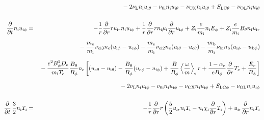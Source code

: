 \documentclass[11pt]{article}
\def\r#1{{\rm#1}}
\def\ddt{\frac{\partial}{\partial t}}
\def\ddr{\frac{\partial}{\partial r}}
\def\ave#1{\left\langle#1\right\rangle}
\def\me{m_\r{e}}
\def\mi{m_\r{i}}
\def\mb{m_\r{b}}
\def\mue{\mu_\r{e}}
\def\mui{\mu_\r{i}}
\def\De{D_\r{e}}
\def\Di{D_\r{i}}
\def\chii{\chi_\r{i}}
\def\nee{n_\r{e}}
\def\ni{n_\r{i}}
\def\nb{n_\r{b}}
\def\uir{u_{\r{i}r}}
\def\ueth{u_{\r{e}\theta}}
\def\uith{u_{\r{i}\theta}}
\def\ueph{u_{\r{e}\phi}}
\def\uiph{u_{\r{i}\phi}}
\def\ubph{u_{\r{b}\phi}}
\def\Er{E_r}
\def\Eph{E_\phi}
\def\Bth{B_\theta}
\def\Bph{B_\phi}
\def\Te{T_\r{e}}
\def\Ti{T_\r{i}}
\def\Zi{Z_\r{i}}
\def\nubi{\nu_\r{bi}}
\def\nuni{\nu_\r{0i}}
\def\nuL{\nu_\r{L}}
\def\nuCX{\nu_\r{CX}}
\def\nuOL{\nu_\r{OL}}
\newcommand{\Frac}[2]{%
  {\displaystyle {\displaystyle #1\over \displaystyle #2}}%
}
\newcommand{\rdprd}[2]{\Frac{\partial #1}{\partial #2}}
\newcommand{\aveaveB}[1]{\left< \!\! \left< #1 \right> \!\! \right>}
\begin{document}
\begin{eqnarray}
\nonumber\\[2.5mm]&&{}
%
  - 2 \nuL \ni \uith
%
  - \nuni \ni \uith
%
  - \nuCX \ni \uith
%
  + S_\r{LC\theta}
%
  - \nuOL \ni \uith
%
%
\\[5mm]
  \ddt \ni \uiph &=&
%
  - \frac{1}{r} \ddr r \uir \ni \uiph
%
  + \frac{1}{r} \ddr r \ni \mui \ddr \uiph
%
  + \Zi \frac{e}{\mi} \ni \Eph
%
  + \Zi \frac{e}{\mi} \Bth \ni \uir 
\nonumber\\[2.5mm]&&{}
%
  - \frac{\me}{\mi} \nu_\r{ei3} \nee (\uiph - \ueph)
%
  - \frac{\me}{\mi} \nu_\r{ei2} \nee (\uith - \ueth)
%
  - \frac{\mb}{\mi} \nubi \nb (\uiph - \ubph)
\nonumber\\[2.5mm]&&{}
%
  - \frac{e^2 \Bph^2 \De}{\mi\Te}\frac{\Bth}{\Bph}\nee
    \left[(\ueth - \uith) - \frac{\Bth}{\Bph}(\ueph - \uiph)
     + \frac{B}{\Bph}\ave{\frac{\omega}{m}}_\r{e} r
     + \frac{1-\alpha_\r{e}}{e\Bph}\ddr \Te + \frac{\Er}{\Bph}\right]
%
\nonumber\\[2.5mm]&&{}
%
  - 2 \nuL \ni \uiph
%
  - \nuni \ni \uiph
%
  - \nuCX \ni \uiph
%
  + S_\r{LC\phi}
%
  - \nuOL \ni \uiph
%
%
\\[5mm]
  \ddt \, \frac{3}{2} \ni \Ti &=&
%
 - \frac{1}{r} \ddr r
   \left( \frac{5}{2} \uir \ni \Ti - \ni \chii \ddr \Ti \right)
%
  + \uir \ddr \ni \Ti

\end{eqnarray}
\end{document}
